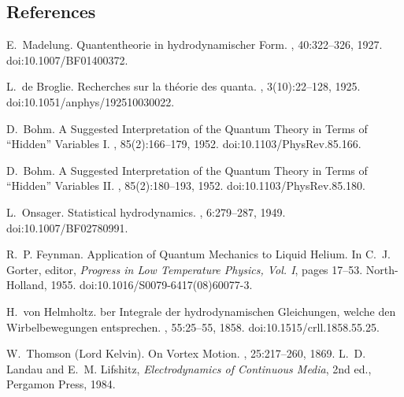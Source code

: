 \documentclass[10pt,reprint,aps,onecolumn,nofootinbib]{revtex4-2}
\begin{document}
\subsection*{References}
        
        \begin{thebibliography}{99}

        E.~Madelung.
        \newblock Quantentheorie in hydrodynamischer Form.
        , 40:322--326, 1927.
        \newblock doi:10.1007/BF01400372.

        L.~de Broglie.
        \newblock Recherches sur la th{\'e}orie des quanta.
        , 3(10):22--128, 1925.
        \newblock doi:10.1051/anphys/192510030022.

        D.~Bohm.
        \newblock A Suggested Interpretation of the Quantum Theory in Terms of ``Hidden'' Variables I.
        , 85(2):166--179, 1952.
        \newblock doi:10.1103/PhysRev.85.166.

        D.~Bohm.
        \newblock A Suggested Interpretation of the Quantum Theory in Terms of ``Hidden'' Variables II.
        , 85(2):180--193, 1952.
        \newblock doi:10.1103/PhysRev.85.180.

        L.~Onsager.
        \newblock Statistical hydrodynamics.
        , 6:279--287, 1949.
        \newblock doi:10.1007/BF02780991.

        R.~P. Feynman.
        \newblock Application of Quantum Mechanics to Liquid Helium.
        \newblock In C.~J. Gorter, editor, {\em Progress in Low Temperature Physics, Vol. I}, pages 17--53. North-Holland, 1955.
        \newblock doi:10.1016/S0079-6417(08)60077-3.

        H.~von Helmholtz.
        ber Integrale der hydrodynamischen Gleichungen, welche den Wirbelbewegungen entsprechen.
        , 55:25--55, 1858.
        \newblock doi:10.1515/crll.1858.55.25.

        W.~Thomson (Lord Kelvin).
        \newblock On Vortex Motion.
        , 25:217--260, 1869.
        L.~D. Landau and E.~M. Lifshitz,
        \emph{Electrodynamics of Continuous Media}, 2nd ed.,
        Pergamon Press, 1984.


\end{thebibliography}
\end{document}
